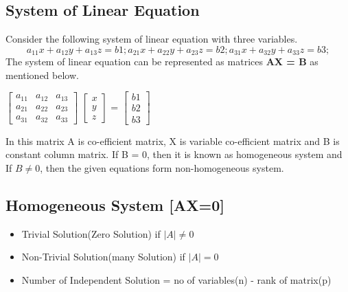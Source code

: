 \subsection{System of Linear Equation}
Consider the following system of linear equation with three variables.\\
\[a_{11}x + a_{12}y + a_{13}z = b1; a_{21}x + a_{22}y + a_{23}z = b2; a_{31}x + a_{32}y + a_{33}z = b3;\]
The system of linear equation can be represented as matrices \textbf{AX = B} as mentioned below.
\begin{center}
    $\begin{bmatrix}
    a_{11} & a_{12} & a_{13}\\
    a_{21} & a_{22} & a_{23}\\
    a_{31} & a_{32} & a_{33}
    \end{bmatrix}$
    $\begin{bmatrix} x\\ y\\ z \end{bmatrix}$ = 
    $\begin{bmatrix} b1\\ b2\\ b3 \end{bmatrix}$\\
\end{center}
In this matrix A is co-efficient matrix, X is variable co-efficient matrix and B is constant column matrix. If B = 0, then it is known as homogeneous system and If \(B \neq 0\), then the given equations form non-homogeneous system.

\subsection*{Homogeneous System [AX=0]}
\begin{itemize}
    \item Trivial Solution(Zero Solution) if \(|A| \neq 0\)
    \item Non-Trivial Solution(many Solution) if \(|A|= 0\)
    \item Number of Independent Solution = no of variables(n) - rank of matrix(p)
\end{itemize}

